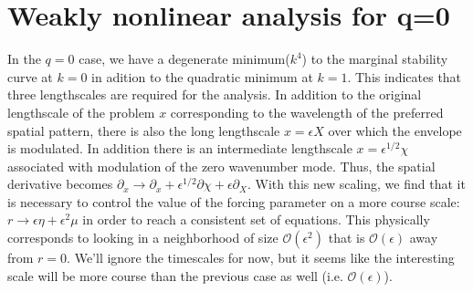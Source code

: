 \documentclass[../main/WavelengthCompetition.tex]{subfiles}
\begin{document}
\section{Weakly nonlinear analysis for q=0}
In the $q=0$ case, we have a degenerate minimum($k^4$) to the marginal stability curve at $k=0$ in adition to the quadratic minimum at $k=1$.  This indicates that three lengthscales are required for the analysis.  In addition to the original lengthscale of the problem $x$ corresponding to the wavelength of the preferred spatial pattern, there is also the long lengthscale $x=\epsilon X$ over which the envelope is modulated.  In addition there is an intermediate lengthscale $x=\epsilon^{1/2} \chi$ associated with modulation of the zero wavenumber mode.  Thus, the spatial derivative becomes $\partial_x\rightarrow \partial_x+ \epsilon^{1/2}\partial{\chi}+\epsilon\partial_{X}$.  With this new scaling, we find that it is necessary to control the value of the forcing parameter on a more course scale: $r\rightarrow \epsilon \eta +\epsilon^2\mu$ in order to reach a consistent set of equations.  This physically corresponds to looking in a neighborhood of size $\mathcal{O}(\epsilon^2)$ that is $\mathcal{O}(\epsilon)$ away from $r=0$. We'll ignore the timescales for now, but it seems like the interesting scale will be more course than the previous case as well (i.e. $\mathcal{O}(\epsilon)$).  
\end{document}
